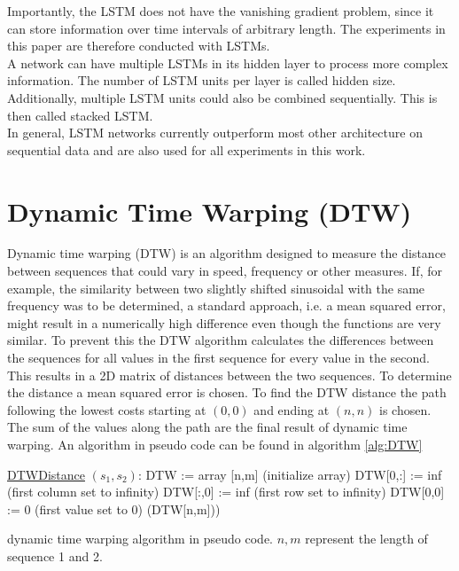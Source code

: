 Importantly, the LSTM does not have the vanishing gradient problem, since it can store information over time intervals of arbitrary length. The experiments in this paper are therefore conducted with LSTMs. \\
A network can have multiple LSTMs in its hidden layer to process more complex information. The number of LSTM units per layer is called hidden size. Additionally, multiple LSTM units could also be combined sequentially. This is then called stacked LSTM. \\
In general, LSTM networks currently outperform most other architecture on sequential data and are also used for all experiments in this work. 

\section{Dynamic Time Warping (DTW)}
\label{section:DTW}

Dynamic time warping (DTW) is an algorithm designed to measure the distance between sequences that could vary in speed, frequency or other measures. If, for example, the similarity between two slightly shifted sinusoidal with the same frequency was to be determined, a standard approach, i.e. a mean squared error, might result in a numerically high difference even though the functions are very similar. To prevent this the DTW algorithm calculates the differences between the sequences for all values in the first sequence for every value in the second. This results in a 2D matrix of distances between the two sequences. To determine the distance a mean squared error is chosen. To find the DTW distance the path following the lowest costs starting at $(0,0)$ and ending at $(n,n)$ is chosen. The sum of the values along the path are the final result of dynamic time warping. An algorithm in pseudo code can be found in algorithm \ref{alg:DTW}


\begin{minipage}[right]{0.9\linewidth}
	\begin{algorithm}[H]
	
	\underline{DTWDistance} $(s_1, s_2)$:\;
	\;
		DTW := array [n,m] 	(initialize array) \;
		\;
		DTW[0,:] := inf		(first column set to infinity) \;
		DTW[:,0] := inf		(first row set to infinity) \;
		DTW[0,0] := 0		(first value set to 0) \;
		\;
		\Return(DTW[n,m]))		
	\caption{dynamic time warping algorithm in pseudo code. $n,m$ represent the length of sequence 1 and 2.}
	\label{alg:DTW}
\end{algorithm}
\end{minipage}


